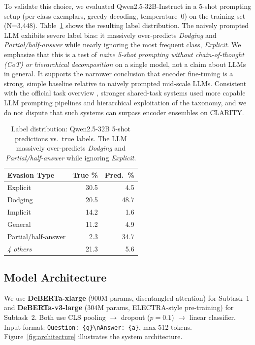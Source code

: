 \documentclass[11pt]{article}
\begin{document}
To validate this choice, we evaluated Qwen2.5-32B-Instruct \citep{yang2024qwen25} in a 5-shot prompting setup (per-class exemplars, greedy decoding, temperature~0) on the training set (N=3,448). Table~\ref{tab:llm_bias} shows the resulting label distribution. The naively prompted LLM exhibits severe label bias: it massively over-predicts \textit{Dodging} and \textit{Partial/half-answer} while nearly ignoring the most frequent class, \textit{Explicit}. We emphasize that this is a test of \emph{naive 5-shot prompting without chain-of-thought (CoT) or hierarchical decomposition} on a single model, not a claim about LLMs in general. It supports the narrower conclusion that encoder fine-tuning is a strong, simple baseline relative to naively prompted mid-scale LLMs. Consistent with the official task overview \citep{semeval2026task6}, stronger shared-task systems used more capable LLM prompting pipelines and hierarchical exploitation of the taxonomy, and we do not dispute that such systems can surpass encoder ensembles on CLARITY.

\begin{table}[t]
\centering
\small
\begin{tabular}{@{}lrr@{}}
\toprule
\textbf{Evasion Type} & \textbf{True \%} & \textbf{Pred.~\%} \\
\midrule
Explicit & 30.5 & 4.5 \\
Dodging & 20.5 & 48.7 \\
Implicit & 14.2 & 1.6 \\
General & 11.2 & 4.9 \\
Partial/half-answer & 2.3 & 34.7 \\
\textit{4 others} & 21.3 & 5.6 \\
\bottomrule
\end{tabular}
\caption{Label distribution: Qwen2.5-32B 5-shot predictions vs.\ true labels. The LLM massively over-predicts \textit{Dodging} and \textit{Partial/half-answer} while ignoring \textit{Explicit}.}
\label{tab:llm_bias}
\end{table}

\subsection{Model Architecture}

We use \textbf{DeBERTa-xlarge} (900M params, disentangled attention) for Subtask~1 and \textbf{DeBERTa-v3-large} (304M params, ELECTRA-style pre-training) for Subtask~2. Both use CLS pooling $\rightarrow$ dropout ($p{=}0.1$) $\rightarrow$ linear classifier. Input format: \texttt{Question: \{q\}\textbackslash nAnswer: \{a\}}, max 512 tokens. Figure~\ref{fig:architecture} illustrates the system architecture.
\end{document}

